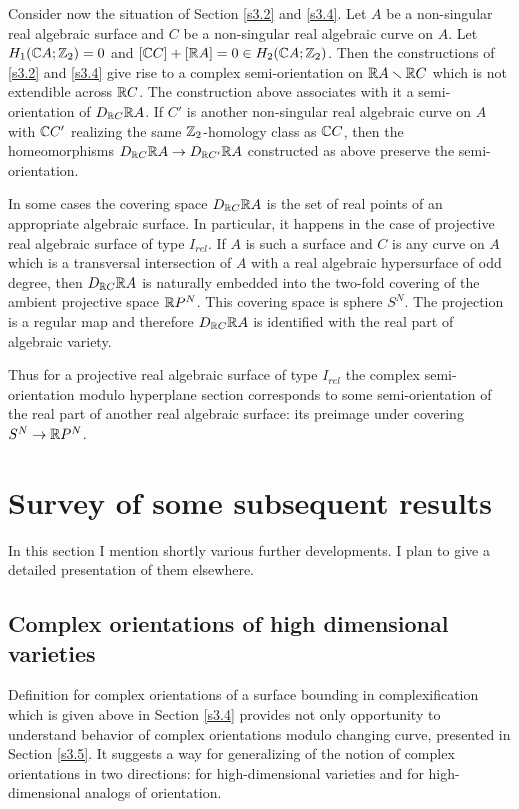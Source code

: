 \documentclass{article}
\numberwithin{equation}{section}
\begin{document}
Consider now the situation of Section \ref{s3.2} and \ref{s3.4}. Let $A$ be a
non-singular real algebraic surface and $C$ be a non-singular real
algebraic curve on $A$. Let $H_1(\mathbb C A;\mathbb Z_2)=0$ and $[\mathbb C C]+[\mathbb R A]=0\in
H_2(\mathbb C A;\mathbb Z_2)$. Then the constructions of \ref{s3.2} and \ref{s3.4} 
give rise to a
complex semi-orientation on $\mathbb R A\smallsetminus\mathbb R C$ which is not
extendible across $\mathbb R C$. The construction above associates with it a
semi-orientation of $D_{\mathbb R C}\mathbb R A$. If $C'$ is another non-singular
real algebraic curve on $A$ with $\mathbb C C'$ realizing the same
$\mathbb Z_2$-homology class as $\mathbb C C$, then the homeomorphisms $D_{\mathbb R C}\mathbb R
A\to D_{\mathbb R C'}\mathbb R A$ constructed as above preserve the semi-orientation.

In some cases the covering space $D_{\mathbb R C}\mathbb R A$ is the set of real
points of an appropriate algebraic surface. In particular, it happens
in the case of projective real algebraic surface of type $I_{rel}$. If
$A$ is such a surface and $C$ is any curve on $A$ which is a
transversal intersection of $A$ with a real algebraic hypersurface of
odd degree, then $D_{\mathbb R C}\mathbb R A$ is naturally embedded into the two-fold
covering of the ambient projective space $\mathbb R P^N$. This covering space
is sphere $S^N$. The projection is a regular map and therefore  $D_{\mathbb R
C}\mathbb R A$ is identified with the real part of algebraic variety.

Thus for a projective real algebraic surface of type $I_{rel}$ the
complex semi-orientation modulo hyperplane section corresponds to some
semi-orientation of the real part of another real algebraic surface:
its preimage  under covering $S^N\to\mathbb R P^N$.



\section{Survey of some subsequent results}\label{s4} 

In this section I mention shortly various further developments. I plan
to give a detailed presentation of them elsewhere.

\subsection{Complex orientations of high dimensional
varieties}\label{s4.1}
  Definition for complex orientations of a surface bounding in
complexification which is given above in Section \ref{s3.4} provides not only
opportunity to understand behavior of complex orientations modulo
changing curve, presented in Section \ref{s3.5}. It suggests a way for
generalizing of the notion of complex orientations in two directions:
for high-dimensional varieties and for high-dimensional analogs of
orientation.
\end{document}

